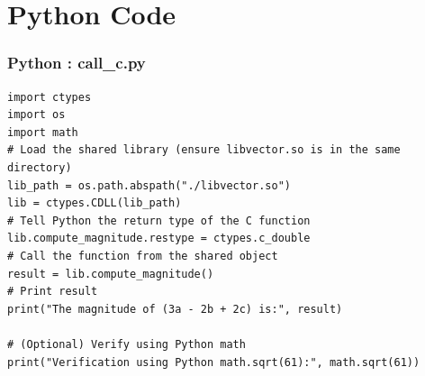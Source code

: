 \documentclass{beamer}
\theoremstyle{remark}
\numberwithin{equation}{section}
\begin{document}
\section{Python Code}
\begin{frame}[fragile]
\frametitle{Python : call\_c.py}
\begin{lstlisting}
import ctypes
import os
import math
# Load the shared library (ensure libvector.so is in the same directory)
lib_path = os.path.abspath("./libvector.so")
lib = ctypes.CDLL(lib_path)
# Tell Python the return type of the C function
lib.compute_magnitude.restype = ctypes.c_double
# Call the function from the shared object
result = lib.compute_magnitude()
# Print result
print("The magnitude of (3a - 2b + 2c) is:", result)

# (Optional) Verify using Python math
print("Verification using Python math.sqrt(61):", math.sqrt(61))

\end{lstlisting}
\end{frame}
\end{document}
